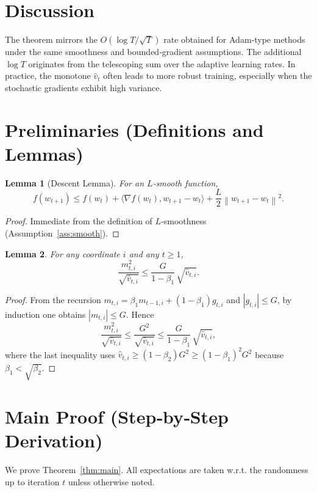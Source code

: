 \documentclass{article}
\newtheorem{lemma}{Lemma}
\newcommand{\norm}[1]{\left\lVert#1\right\rVert}
\begin{document}
\section*{Discussion}
The theorem mirrors the $O(\log T/\sqrt{T})$ rate obtained for Adam‐type methods under the same smoothness and bounded‑gradient assumptions. The additional $\log T$ originates from the telescoping sum over the adaptive learning rates. In practice, the monotone $\hat v_t$ often leads to more robust training, especially when the stochastic gradients exhibit high variance.

\newpage
\section*{Preliminaries (Definitions and Lemmas)}
\begin{lemma}[Descent Lemma]\label{lem:descent}
For an $L$‑smooth function,
\[
f(w_{t+1})\le f(w_t)+\langle\nabla f(w_t),w_{t+1}-w_t\rangle+\frac{L}{2}\norm{w_{t+1}-w_t}^2 .
\]
\end{lemma}
\begin{proof}
Immediate from the definition of $L$‑smoothness (Assumption~\ref{ass:smooth}). \qedhere
\end{proof}

\begin{lemma}\label{lem:bound-m}
For any coordinate $i$ and any $t\ge1$,
\[
\frac{m_{t,i}^2}{\sqrt{\hat v_{t,i}}}\le
\frac{G}{1-\beta_1}\,\sqrt{\hat v_{t,i}} .
\]
\end{lemma}
\begin{proof}
From the recursion $m_{t,i}= \beta_1 m_{t-1,i}+(1-\beta_1)g_{t,i}$ and $|g_{t,i}|\le G$,
by induction one obtains $|m_{t,i}|\le G$. Hence
\[
\frac{m_{t,i}^2}{\sqrt{\hat v_{t,i}}}\le
\frac{G^2}{\sqrt{\hat v_{t,i}}}
\le
\frac{G}{1-\beta_1}\,\sqrt{\hat v_{t,i}},
\]
where the last inequality uses $\hat v_{t,i}\ge (1-\beta_2)G^2\ge (1-\beta_1)^2 G^2$ because $\beta_1<\sqrt{\beta_2}$. \qedhere
\end{proof}

\section*{Main Proof (Step‑by‑Step Derivation)}
We prove Theorem~\ref{thm:main}. All expectations are taken w.r.t. the randomness up to iteration $t$ unless otherwise noted.
\end{document}
